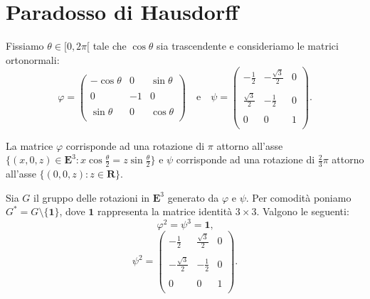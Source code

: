 \documentclass[a4paper,oneside,11pt]{book}
\theoremstyle{definition} \newtheorem{Def}{Definizione}
\theoremstyle{plain} \newtheorem{teo}{Teorema}
\theoremstyle{plain} \newtheorem{cor}[teo]{Corollario}
\theoremstyle{definition} \newtheorem{lem}[teo]{Lemma}
\theoremstyle{plain} \newtheorem{pro}[teo]{Proposizione}
\begin{document}
\section{Paradosso di Hausdorff}
	
	Fissiamo $\theta \in [0, 2\pi[$ tale che $\cos \theta$ sia trascendente e consideriamo le matrici ortonormali: %
	\begin{equation}\label{phipsi}
		\varphi = \begin{pmatrix}
			-\cos\theta &0 &\sin\theta \\ \\
			0  &-1 &0 \\ \\
			\sin\theta &0 &\cos\theta \\
		\end{pmatrix} \quad \text{e} \quad \psi = \begin{pmatrix}
			 -\frac{1}{2} & -\frac{\sqrt{3}}{2} & 0 \\ \\
			 \frac{\sqrt{3}}{2} & -\frac{1}{2} & 0 \\ \\
			 0 & 0 & 1 \\
		\end{pmatrix} \text{.}
	\end{equation}
	
	La matrice $\varphi$ corrisponde ad una rotazione di $\pi$ attorno all'asse $\{(x,0,z) \in \mathbf{E}^3 : x \cos \frac{\theta}{2} = z \sin \frac{\theta}{2}\}$ e $\psi$ corrisponde ad una rotazione di $\frac{2}{3}\pi$ attorno all'asse $\{(0,0,z): z \in \mathbf{R}\}$.
	
	Sia $G$ il gruppo delle rotazioni in $\mathbf{E}^3$ generato da $\varphi$ e $\psi$. Per comodità poniamo $G^* = G \setminus \{\mathbf{1}\}$, dove $\mathbf{1}$ rappresenta la matrice identità $3 \times 3$. Valgono le seguenti:
	\begin{equation}\label{phipsi1}
		\varphi^2 = \psi^3 = \mathbf{1} \text{,}
	\end{equation}
	\begin{equation}\label{psi2}
		\psi^2 = \begin{pmatrix}
			-\frac{1}{2} &\frac{\sqrt{3}}{2} &0\\ \\
			-\frac{\sqrt{3}}{2} &-\frac{1}{2} &0\\ \\
			0 &0 &1\\
		\end{pmatrix} \text{.}
	\end{equation}
	
\end{document}
